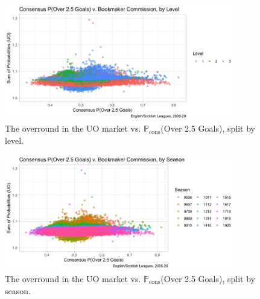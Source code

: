 \documentclass[a4paper,10pt]{report}
\begin{document}
\begin{figure}[h!]\begin{center}
		\includegraphics[width=0.9\textwidth]{ensco_14c_overround_uo_l.png}  
		\caption{The overround in the UO market vs. $\mathbb{P}_{\textrm{cons}}$(Over 2.5 Goals), split by level.}\label{FIG:02_06a_overrounduo_level}
\end{center}\end{figure}
\begin{figure}[h!]\begin{center}
		\includegraphics[width=0.9\textwidth]{ensco_14d_overround_uo_s.png}  
		\caption{The overround in the UO market vs. $\mathbb{P}_{\textrm{cons}}$(Over 2.5 Goals), split by season.}\label{FIG:02_06b_overrounduo_season}
\end{center}\end{figure} \pagebreak
\end{document}
